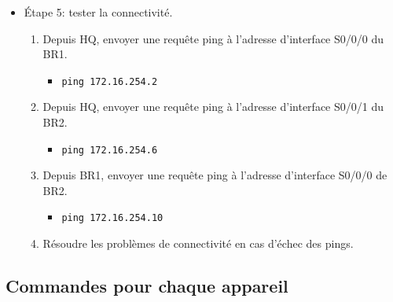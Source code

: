 \documentclass[a4paper]{article}
\begin{document}
\begin{itemize}
\item Étape 5: tester la connectivité.
\begin{enumerate}
    \item Depuis HQ, envoyer une requête ping à l'adresse d'interface S0/0/0 du BR1.
    \begin{example}
        \begin{itemize}
            \item \texttt{ping 172.16.254.2}
        \end{itemize}
    \end{example}
    \item Depuis HQ, envoyer une requête ping à l'adresse d'interface S0/0/1 du BR2.
    \begin{example}
        \begin{itemize}
            \item \texttt{ping 172.16.254.6}
        \end{itemize}
    \end{example}
    \item Depuis BR1, envoyer une requête ping à l'adresse d'interface S0/0/0 de BR2.
    \begin{example}
        \begin{itemize}
            \item \texttt{ping 172.16.254.10}
        \end{itemize}
    \end{example}
    \item Résoudre les problèmes de connectivité en cas d'échec des pings.
\end{enumerate}





\end{itemize}










\subsection{Commandes pour chaque appareil}
\end{document}
